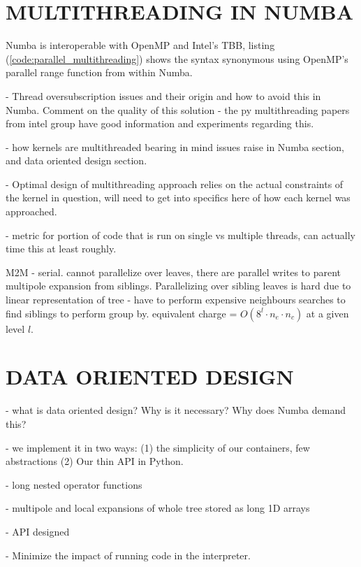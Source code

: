 \documentclass{IEEEcsmag}
\begin{document}
\section{MULTITHREADING IN NUMBA}

Numba is interoperable with OpenMP and Intel's TBB, listing (\ref{code:parallel_multithreading}) shows the syntax synonymous using OpenMP's parallel range function from within Numba. 

- Thread oversubscription issues and their origin and how to avoid this in Numba. Comment on the quality of this solution - the py multithreading papers from intel group have good information and experiments regarding this.

- how kernels are multithreaded bearing in mind issues raise in Numba section, and data oriented design section.

- Optimal design of multithreading approach relies on the actual constraints of the kernel in question, will need to get into specifics here of how each kernel was approached.

- metric for portion of code that is run on single vs multiple threads, can actually time this at least roughly.

M2M
- serial. cannot parallelize over leaves, there are parallel writes to parent multipole expansion from siblings. Parallelizing over sibling leaves is hard due to linear representation of tree - have to perform expensive neighbours searches to find siblings to perform group by. equivalent charge = $O(8^l \cdot n_e \cdot n_c)$ at a given level $l$.



\section{DATA ORIENTED DESIGN}

- what is data oriented design? Why is it necessary? Why does Numba demand this?

- we implement it in two ways: (1) the simplicity of our containers, few abstractions (2) Our thin API in Python.

- long nested operator functions

- multipole and local expansions of whole tree stored as long 1D arrays


- API designed

- Minimize the impact of running code in the interpreter.
\end{document}
